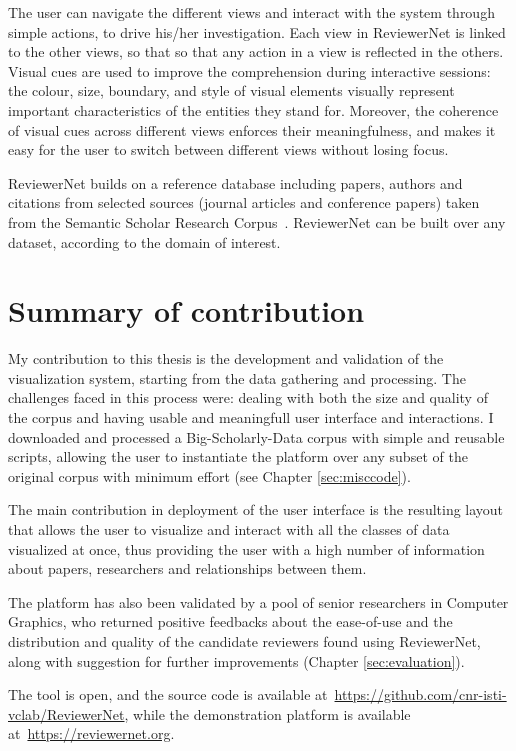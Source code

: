 The user can navigate the different views and interact with the system through simple actions, to drive his/her investigation. Each view in ReviewerNet is linked to the other views, so that so that any action in a view is reflected in the others. Visual cues are used to improve the comprehension during interactive sessions: the colour, size, boundary, and style of visual elements visually represent important characteristics of the entities they stand for. Moreover, the coherence of visual cues across different views enforces their meaningfulness, and makes it easy for the user to switch between different views without losing focus.  

ReviewerNet builds on a reference database including papers, authors and citations from selected sources (journal articles and conference papers) taken from the Semantic Scholar Research Corpus~\cite{ammar:18}. ReviewerNet can be built over any dataset, according to the domain of interest.

\section{Summary of contribution}

My contribution to this thesis is the development and validation of the visualization system, starting from the data gathering and processing. The challenges faced in this process were: dealing with both the size and quality of the corpus and having usable and meaningfull user interface and interactions. I downloaded and processed a Big-Scholarly-Data corpus with simple and reusable scripts, allowing the user to instantiate the platform over any subset of the original corpus with minimum effort (see Chapter \ref{sec:misccode}). 

The main contribution in deployment of the user interface is the resulting layout that allows the user to visualize and interact with all the classes of data visualized at once, thus providing the user with a high number of information about papers, researchers and relationships between them.

The platform has also been validated by a pool of senior researchers in Computer Graphics, who returned positive feedbacks about the ease-of-use and the distribution and quality of the candidate reviewers found using ReviewerNet, along with suggestion for further improvements (Chapter \ref{sec:evaluation}). 

The tool is open, and the source code is available at~\url{https://github.com/cnr-isti-vclab/ReviewerNet}, while the demonstration platform is available at~\url{https://reviewernet.org}.
